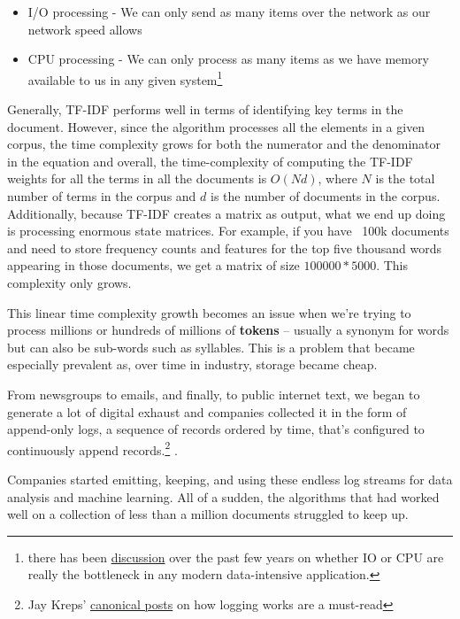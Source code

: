 \documentclass[11pt, table]{diazessay} %
\begin{document}
\begin{sloppypar}
\begin{itemize}
  \item I/O processing - We can only send as many items over the network as our network speed allows
  \item CPU processing - We can only process as many items as we have memory available to us in any given system\footnote{there has been \href{https://benhoyt.com/writings/io-is-no-longer-the-bottleneck/}{discussion} over the past few years on whether IO or CPU are really the bottleneck in any modern data-intensive application.}
\end{itemize}


Generally, TF-IDF performs well in terms of identifying key terms in the document. However, since the algorithm processes all the elements in a given corpus, the time complexity grows for both the numerator and the denominator in the equation and overall, the time-complexity of computing the TF-IDF weights for all the terms in all the documents is $O(Nd)$, where $N$ is the total number of terms in the corpus and $d$ is the number of documents in the corpus. Additionally, because TF-IDF creates a matrix as output, what we end up doing is processing enormous state matrices. For example, if you have ~100k documents and need to store frequency counts and features for the top five thousand words appearing in those documents, we get a matrix of size $100000*5000$. This complexity only grows.

This linear time complexity growth becomes an issue when we're trying to process millions or hundreds of millions of \textbf{tokens} -- usually a synonym for words but can also be sub-words such as syllables. This is a problem that became especially prevalent as, over time in industry, storage became cheap.

From newsgroups to emails, and finally, to public internet text, we began to generate a lot of digital exhaust and companies collected it in the form of append-only logs\citep{kreps2014heart}, a sequence of records ordered by time, that's configured to continuously append records.\footnote{Jay Kreps' \href{https://engineering.linkedin.com/distributed-systems/log-what-every-software-engineer-should-know-about-real-time-datas-unifying}{canonical posts} on how logging works are a must-read} .

Companies started emitting, keeping, and using these endless log streams for data analysis and machine learning. All of a sudden, the algorithms that had worked well on a collection of less than a million documents struggled to keep up.


\end{sloppypar}
\end{document}

